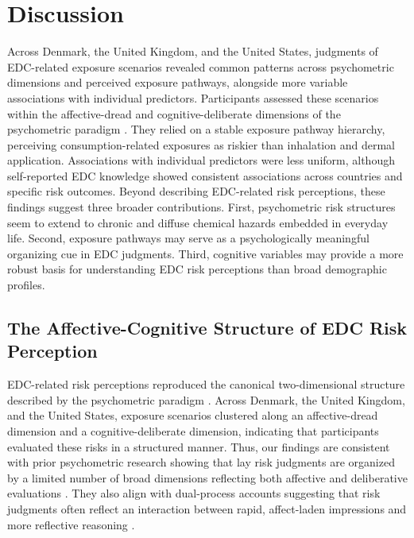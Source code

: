 \section{Discussion}
Across Denmark, the United Kingdom, and the United States, judgments of EDC-related exposure scenarios revealed common patterns across psychometric dimensions and perceived exposure pathways, alongside more variable associations with individual predictors. Participants assessed these scenarios within the affective-dread and cognitive-deliberate dimensions of the psychometric paradigm \citep{fischhoff1978safe,slovic1987perception}. They relied on a stable exposure pathway hierarchy, perceiving consumption-related exposures as riskier than inhalation and dermal application. Associations with individual predictors were less uniform, although self-reported EDC knowledge showed consistent associations across countries and specific risk outcomes. Beyond describing EDC-related risk perceptions, these findings suggest three broader contributions. First, psychometric risk structures seem to extend to chronic and diffuse chemical hazards embedded in everyday life. Second, exposure pathways may serve as a psychologically meaningful organizing cue in EDC judgments. Third, cognitive variables may provide a more robust basis for understanding EDC risk perceptions than broad demographic profiles.

\subsection{The Affective-Cognitive Structure of EDC Risk Perception}
EDC-related risk perceptions reproduced the canonical two-dimensional structure described by the psychometric paradigm \citep{fischhoff1978safe, slovic1987perception}. Across Denmark, the United Kingdom, and the United States, exposure scenarios clustered along an affective-dread dimension and a cognitive-deliberate dimension, indicating that participants evaluated these risks in a structured manner. Thus, our findings are consistent with prior psychometric research showing that lay risk judgments are organized by a limited number of broad dimensions reflecting both affective and deliberative evaluations \citep{slovic1987perception, slovic2012perception}. They also align with dual-process accounts suggesting that risk judgments often reflect an interaction between rapid, affect-laden impressions and more reflective reasoning \citep{kahneman2011thinking, finucane2000affect}.

